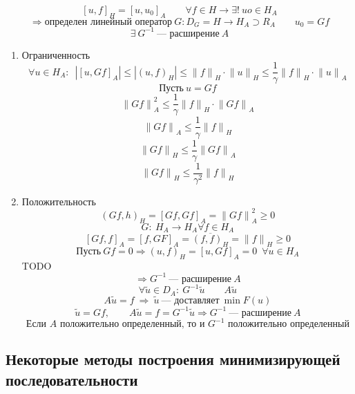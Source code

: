 \documentclass[12pt, a4paper]{article}
\begin{document}
\[ {[u,f]}_H = {[u,u_0]}_A \qquad \forall f \in H \rightarrow \exists! \ uo \in H_A \]
\[ \Rightarrow \text{определен линейный оператор} \ G: D_G = H \rightarrow H_A \supset R_A \qquad u_0 = Gf \]
\[ \exists \ G^{-1} \ \text{--- расширение} \ A \]

\begin{enumerate}
	\item Ограниченность
	\[ \forall u \in H_A: \enspace \left| {[u, Gf]}_A \right| \leq | {(u,f)}_H | \leq {\| f \|}_H \cdot {\| u \|}_H \leq \frac{1}{\gamma} {\| f \|}_H \cdot {\| u \|}_A \]
	\[ \text{Пусть} \ u = Gf \]
	\[ {\| Gf \|}_A^2 \leq  \frac{1}{\gamma} {\| f \|}_H \cdot {\| Gf \|}_A \]
	\[ {\| Gf \|}_A \leq  \frac{1}{\gamma} {\| f \|}_H \]
	\[ {\| Gf \|}_H \leq  \frac{1}{\gamma} {\| Gf \|}_A \]
	\[ {\| Gf \|}_H \leq  \frac{1}{\gamma^2} {\| f \|}_H \]
	\item Положительность
	\[ {(Gf,h)}_H = {[Gf, Gf]}_A = {\| Gf \|}^2_A \geq 0 \]
	\[ G: \ H_A \rightarrow H_A \forall f \in H_A \]
	\[ {[Gf,f]}_A = {[f,GF]}_A = \overline{{(f,f)}_H} = {\| f \|}_H \geq 0 \]
	\[ \text{Пусть} \ Gf = 0 \Rightarrow {(u,f)}_H = {[u, Gf]}_A = 0 \enspace \forall u \in H_A \]
	TODO
	\[ \Rightarrow G^{-1} \ \text{--- расширение} \ A \]
	\[ \forall \tilde{u} \in D_A: \ G^{-1} \tilde{u} \qquad A \tilde{u} \]
	\[ A \tilde{u} = f \ \Rightarrow \ \tilde{u} \ \text{--- доставляет} \ \min F(u) \]
	\[ \tilde{u} = Gf, \qquad A \tilde{u} = f = G^{-1} \tilde{u} \Rightarrow G^{-1} \ \text{--- расширение} \ A \]
	\[ \text{Если $A$ положительно определенный, то и $G^{-1}$ положительно определенный} \]
\end{enumerate}


\subsection{Некоторые методы построения минимизирующей последовательности}
\end{document}
